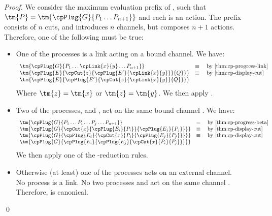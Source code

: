 \documentclass[UKenglish]{llncs}
\begin{document}
\begin{subappendices}
\begin{proof}
    We consider the maximum evaluation prefix  of , such that
    $\tm{P} = \tm{\cpPlug{G}{P_1 \dots P_{n+1}}}$ and each  is an
    action. The prefix  consists of $n$ cuts, and introduces $n$ channels,
    but composes $n+1$ actions. Therefore, one of the following must be true: 
    \begin{itemize}
    \item
      One of the processes is a link  acting on a bound
      channel. We have: 
      \begin{gather*}
        \begin{array}{ll}
          \tm{\cpPlug{G}{P_1 \dots \cpLink{x}{y} \dots P_{n+1}}}
          & \equiv \quad \text{by \cref{thm:cp-progress-link}}
          \\
          \tm{\cpPlug{E}{\cpCut{z}{\cpPlug{E'}{\cpLink{x}{y}}}{Q}}}
          & \equiv \quad \text{by \cref{thm:cp-display-cut}}
          \\
          \tm{\cpPlug{E}{\cpPlug{E'}{\cpCut{z}{\cpLink{x}{y}}{Q}}}}
        \end{array}
      \end{gather*}
      Where $\tm{z} = \tm{x}$ or $\tm{z} = \tm{y}$.
      We then apply .
    \item
      Two of the processes,  and , act on the same bound channel
      . We have:
      \begin{gather*}
        \begin{array}{ll}
          \tm{\cpPlug{G}{P_1 \dots P_i \dots P_j \dots P_{n+1}}}
          & = \quad \text{by \cref{thm:cp-progress-beta}}
          \\
          \tm{\cpPlug{G}{\cpCut{x}{\cpPlug{E_i}{P_i}}{\cpPlug{E_j}{P_j}}}}
          & \equiv \quad \text{by \cref{thm:cp-display-cut}} 
          \\
          \tm{\cpPlug{G}{\cpPlug{E_i}{\cpCut{x}{P_i}{\cpPlug{E_j}{P_j}}}}}
          & \equiv \quad \text{by \cref{thm:cp-display-cut}} 
          \\
          \tm{\cpPlug{G}{\cpPlug{E_i}{\cpPlug{E_j}{\cpCut{x}{P_i}{P_j}}}}} 
        \end{array}
      \end{gather*}
      We then apply one of the \textbeta-reduction rules.
    \item
      Otherwise (at least) one of the processes acts on an external channel.
      \\
      No process  is a link.
      No two processes  and  act on the same channel .
      Therefore,  is canonical.
    \end{itemize}
    \qed
  \end{proof}


\end{subappendices}
\end{document}
